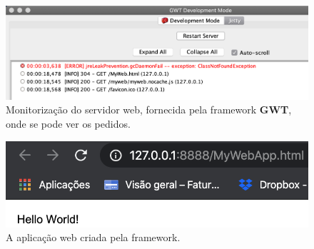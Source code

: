 \begin{figure}[H]
    \centering
    \includegraphics[scale=0.5]{images/gwt-2.png}
    \caption{Monitorização do servidor web, fornecida pela framework \textbf{GWT}, onde se pode ver os pedidos.}
    \label{fig:gwt-2}
\end{figure}

\begin{figure}[H]
    \centering
    \includegraphics[scale=0.8]{images/gwt-3.png}
    \caption{A aplicação web criada pela framework.}
    \label{fig:gwt-3}
\end{figure}
